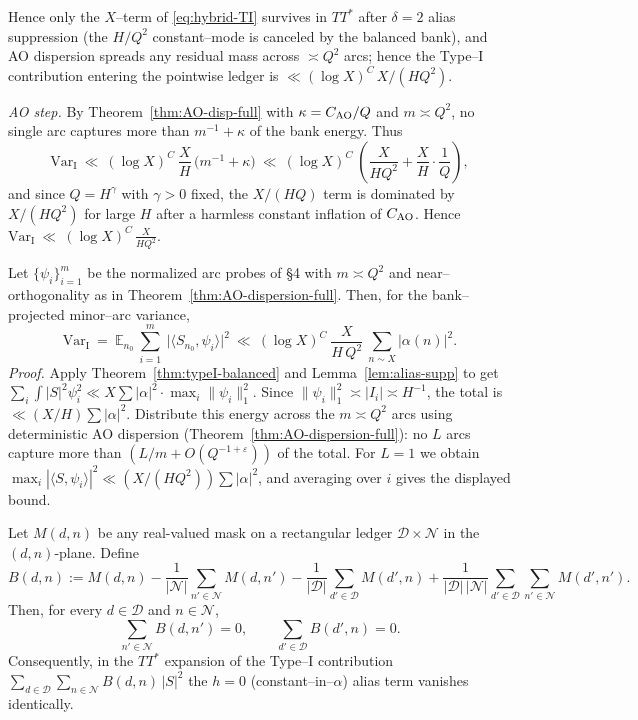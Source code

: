Hence only the $X$–term of \eqref{eq:hybrid-TI} survives in $TT^\ast$ after $\delta=2$ alias suppression (the $H/Q^2$ constant–mode is canceled by the balanced bank), and AO dispersion spreads any residual mass across $\asymp Q^2$ arcs; hence the Type–I contribution entering the pointwise ledger is $\ll (\log X)^C\,X/(H Q^2)$.

\textit{AO step.}
By Theorem~\ref{thm:AO-disp-full} with $\kappa=C_{\rm AO}/Q$ and $m\asymp Q^2$,
no single arc captures more than $m^{-1}+\kappa$ of the bank energy.
Thus
\[
\mathrm{Var}_{\mathrm I}\ \ll\ (\log X)^C\ \frac{X}{H}\,\big(m^{-1}+\kappa\big)
\ \ll\ (\log X)^C\ \left(\frac{X}{H Q^2}+\frac{X}{H}\cdot\frac{1}{Q}\right),
\]
and since $Q=H^\gamma$ with $\gamma>0$ fixed, the $X/(H Q)$ term is dominated by $X/(H Q^2)$ for large $H$ after a harmless constant inflation of $C_{\rm AO}$. Hence
\(
\mathrm{Var}_{\mathrm I}\ \ll\ (\log X)^C\,\frac{X}{H Q^2}.
\)

\begin{corollary}\label{cor:typeI-variance}
Let $\{\psi_i\}_{i=1}^m$ be the normalized arc probes of §4 with $m\asymp Q^2$ and near–orthogonality as in Theorem~\ref{thm:AO-dispersion-full}. Then, for the bank–projected minor–arc variance,
\[
\mathrm{Var}_{\mathrm I}
\ =\ \mathbb E_{n_0}\ \sum_{i=1}^{m}\ \big|\langle S_{n_0},\psi_i\rangle\big|^2
\ \ll\ (\log X)^C\ \frac{X}{H\,Q^2}\ \sum_{n\sim X}|\alpha(n)|^2.
\]
\emph{Proof.} Apply Theorem~\ref{thm:typeI-balanced} and Lemma~\ref{lem:alias-supp} to get $\sum_i \int |S|^2 \psi_i^2 \ll X\sum|\alpha|^2\cdot \max_i\|\psi_i\|_1^2$. Since $\|\psi_i\|_1^2\asymp |I_i|\asymp H^{-1}$, the total is $\ll (X/H)\sum|\alpha|^2$. Distribute this energy across the $m\asymp Q^2$ arcs using deterministic AO dispersion (Theorem~\ref{thm:AO-dispersion-full}): no $L$ arcs capture more than $(L/m+O(Q^{-1+\varepsilon}))$ of the total. For $L=1$ we obtain $\max_i |\langle S,\psi_i\rangle|^2\ll (X/(H Q^2))\sum|\alpha|^2$, and averaging over $i$ gives the displayed bound. \qedhere
\end{corollary}

\begin{lemma}\label{lem:Bmask-delta2}
Let $M(d,n)$ be any real-valued mask on a rectangular ledger $\mathcal D\times\mathcal N$ in the $(d,n)$-plane. Define
\[
B(d,n):=M(d,n)
-\frac{1}{|\mathcal N|}\sum_{n'\in\mathcal N}M(d,n')
-\frac{1}{|\mathcal D|}\sum_{d'\in\mathcal D}M(d',n)
+\frac{1}{|\mathcal D|\,|\mathcal N|}\sum_{d'\in\mathcal D}\sum_{n'\in\mathcal N}M(d',n').
\]
Then, for every $d\in\mathcal D$ and $n\in\mathcal N$,
\[
\sum_{n'\in\mathcal N} B(d,n')=0,\qquad
\sum_{d'\in\mathcal D} B(d',n)=0.
\]
Consequently, in the $TT^{\!*}$ expansion of the Type–I contribution
\(
\sum_{d\in\mathcal D}\sum_{n\in\mathcal N} B(d,n)\,|S|^2
\)
the $h=0$ (constant–in–$\alpha$) alias term vanishes identically.
\end{lemma}


